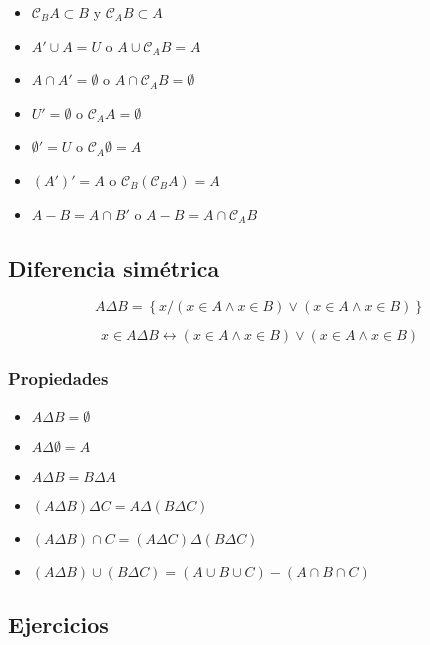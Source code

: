 \documentclass[
  16pt,
]{krantz}
\providecommand{\tightlist}{%
  \setlength{\itemsep}{0pt}\setlength{\parskip}{0pt}}
\theoremstyle{definition}
\theoremstyle{definition}
\theoremstyle{definition}
\theoremstyle{definition}
\theoremstyle{remark}
\begin{document}
\begin{itemize}
\tightlist
\item
  \(\mathcal{C}_BA\subset B\) y \(\mathcal{C}_AB\subset A\)
\item
  \(A'\cup A=U\) o \(A\cup \mathcal{C}_AB=A\)
\item
  \(A\cap A'=\emptyset\) o \(A\cap \mathcal{C}_AB=\emptyset\)
\item
  \(U'=\emptyset\) o \(\mathcal{C}_AA=\emptyset\)
\item
  \(\emptyset'=U\) o \(\mathcal{C}_A\emptyset=A\)
\item
  \((A')'=A\) o \(\mathcal{C}_B(\mathcal{C}_BA)=A\)
\item
  \(A-B=A\cap B'\) o \(A-B=A\cap \mathcal{C}_AB\)
\end{itemize}

\hypertarget{diferencia-simuxe9trica}{%
\subsection{Diferencia simétrica}\label{diferencia-simuxe9trica}}

\[
A\Delta B=\left\{x/(x\in A\wedge x\in B)\vee (x\in A\wedge x\in B)\right\}
\]

\[
x\in A\Delta B\leftrightarrow (x\in A\wedge x\in B)\vee (x\in A\wedge x\in B)
\]

\hypertarget{propiedades-7}{%
\subsubsection{Propiedades}\label{propiedades-7}}

\begin{itemize}
\tightlist
\item
  \(A\Delta B=\emptyset\)
\item
  \(A\Delta \emptyset=A\)
\item
  \(A\Delta B=B\Delta A\)
\item
  \((A\Delta B)\Delta C=A\Delta(B\Delta C)\)
\item
  \((A\Delta B)\cap C=(A\Delta C)\Delta(B\Delta C)\)
\item
  \((A\Delta B)\cup(B\Delta C)=(A\cup B\cup C)-(A\cap B\cap C)\)
\end{itemize}

\hypertarget{ejercicios}{%
\subsection{Ejercicios}\label{ejercicios}}
\end{document}
